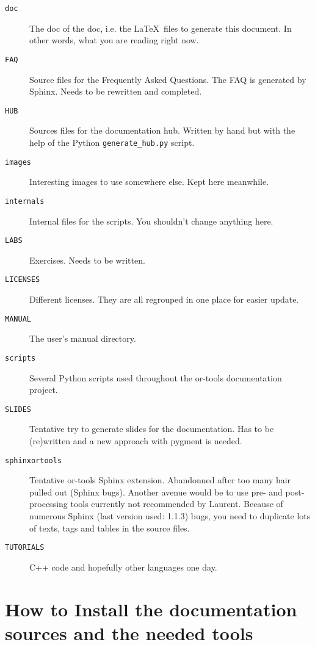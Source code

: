 \documentclass[a4paper,10pt]{article}
\newcommand{\code}[1]{\texttt{#1}}
\begin{document}
\begin{description}
 \item[\code{doc}] The doc of the doc, i.e. the \LaTeX\ files to generate this document. In other words, what you are reading right now.
 \item[\code{FAQ}] Source files for the Frequently Asked Questions. The FAQ is generated by Sphinx. Needs to be rewritten and completed.
 \item[\code{HUB}] Sources files for the documentation hub. Written by hand but with the help of the Python \code{generate\_hub.py} script.
\item[\code{images}] Interesting images to use somewhere else. Kept here meanwhile.
 \item[\code{internals}] Internal files for the scripts. You shouldn't change anything here.
 \item[\code{LABS}] Exercises. Needs to be written.
\item[\code{LICENSES}] Different licenses. They are all regrouped in one place for easier update.
\item[\code{MANUAL}] The user's manual directory.
\item[\code{scripts}] Several Python scripts used throughout the or-tools documentation project.
\item[\code{SLIDES}] Tentative try to generate slides for the documentation. Has to be (re)written and a new approach with pygment is needed.
\item[\code{sphinxortools}] Tentative or-tools Sphinx extension. Abandonned after too many hair pulled out (Sphinx bugs).
Another avenue would be to use pre- and post-processing tools currently not recommended by Laurent. Because of 
numerous Sphinx (last version used: 1.1.3) bugs, you need to duplicate lots of texts, tags and tables in the source files.
\item[\code{TUTORIALS}] C++ code and hopefully other languages one day.
\end{description}



\section{How to Install the documentation sources and the needed tools}
\label{installation}
\end{document}

